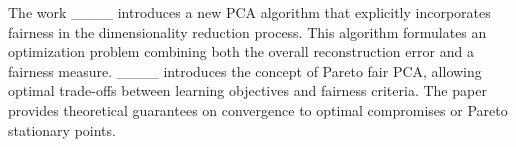 The work ____ introduces a new PCA algorithm that explicitly incorporates fairness in the dimensionality reduction process. %
This algorithm formulates an optimization problem combining both the overall reconstruction error and a fairness measure. %
____ introduces the concept of Pareto fair PCA, allowing optimal trade-offs between learning objectives and fairness criteria. The paper provides %
theoretical guarantees on convergence to optimal compromises or Pareto stationary points.

